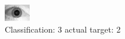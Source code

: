 \begin{figure}[h!]
\begin{center}
\includegraphics[width=0.60\columnwidth]{figures/ID1675_class_3_target_2.png}
\end{center}
\caption{ Classification: 3 actual target: 2}
\label{fig:ID1675_class_3_target_2}
\end{figure}
